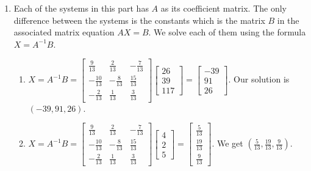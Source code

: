 \begin{ex}
\begin{enumerate}
\item Each of the systems in this part has $A$ as its coefficient matrix.  The only difference between the systems is the constants which is the matrix $B$ in the associated matrix equation $AX=B$.  We solve each of them using the formula $X = A^{-1}B$.

\begin{enumerate}

\item $X = A^{-1}B = \left[ \begin{array}{rrr} \frac{9}{13} & \frac{2}{13} & -\frac{7}{13} \\[3pt] -\frac{10}{13} & -\frac{8}{13} & \frac{15}{13} \\[3pt] -\frac{2}{13} & \frac{1}{13} & \frac{3}{13} \end{array} \right] \left[ \begin{array}{r} 26 \\[3pt] 39 \\[3pt] 117 \end{array}\right] =  \left[ \begin{array}{r} -39 \\[3pt] 91 \\[3pt] 26 \end{array}\right]$.  Our solution is $(-39,91,26)$.

\item $X = A^{-1}B = \left[ \begin{array}{rrr} \frac{9}{13} & \frac{2}{13} & -\frac{7}{13} \\[3pt] -\frac{10}{13} & -\frac{8}{13} & \frac{15}{13} \\[3pt] -\frac{2}{13} & \frac{1}{13} & \frac{3}{13}  \end{array} \right] \left[ \begin{array}{r} 4 \\[3pt] 2 \\[3pt] 5 \end{array}\right] =  \left[ \begin{array}{r} \frac{5}{13} \\[3pt] \frac{19}{13} \\[3pt] \frac{9}{13} \end{array}\right]$.  We get $\left( \frac{5}{13},  \frac{19}{13},  \frac{9}{13}   \right)$.


\end{enumerate}
\end{enumerate}
\end{ex}
